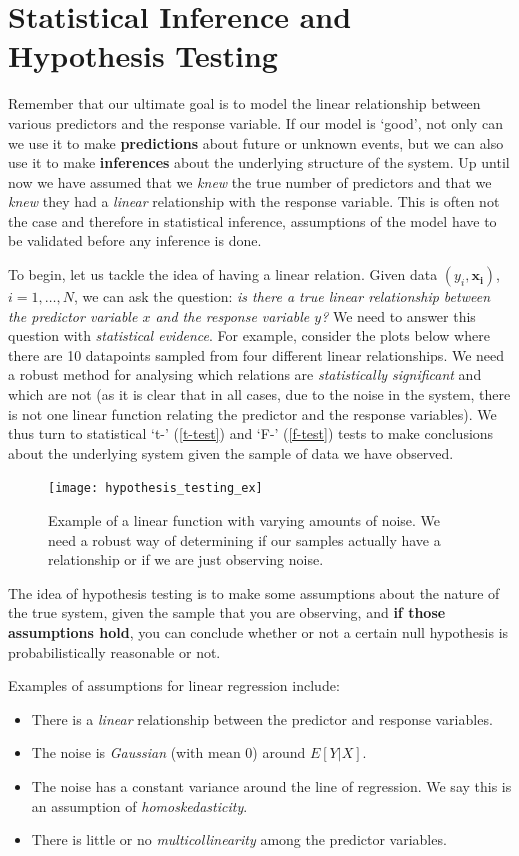 \documentclass{article}
\begin{document}
\section{Statistical Inference and Hypothesis Testing}
Remember that our ultimate goal is to model the linear relationship between various predictors and the response variable. If our model is `good', not only can we use it to make \textbf{predictions} about future or unknown events, but we can also use it to make \textbf{inferences} about the underlying structure of the system. Up until now we have assumed that we \textit{knew} the true number of predictors and that we \textit{knew} they had a \textit{linear} relationship with the response variable. This is often not the case and therefore in statistical inference, assumptions of the model have to be validated before any inference is done.

To begin, let us tackle the idea of having a linear relation. Given data $(y_i, \mathbf{x_i})$, $i=1,\dots,N$, we can ask the question: \textit{is there a true linear relationship between the predictor variable $x$ and the response variable $y$?} We need to answer this question with \textit{statistical evidence}. For example, consider the plots below where there are 10 datapoints sampled from four different linear relationships. We need a robust method for analysing which relations are \textit{statistically significant} and which are not (as it is clear that in all cases, due to the noise in the system, there is not one linear function relating the predictor and the response variables). We thus turn to statistical `t-' (\ref{t-test}) and `F-' (\ref{f-test}) tests to make conclusions about the underlying system given the sample of data we have observed.

\begin{figure}[h]
\center
\texttt{[image: hypothesis\_testing\_ex]}
\caption{Example of a linear function with varying amounts of noise. We need a robust way of determining if our samples actually have a relationship or if we are just observing noise.}\label{im:hypothesis_test}
\end{figure}

The idea of hypothesis testing is to make some assumptions about the nature of the true system, given the sample that you are observing, and \textbf{if those assumptions hold}, you can conclude whether or not a certain null hypothesis is probabilistically reasonable or not.

Examples of assumptions for linear regression include:
\begin{itemize}
\item There is a \textit{linear} relationship between the predictor and response variables.
\item The noise is \textit{Gaussian} (with mean 0) around $E[Y\vert X]$.
\item The noise has a constant variance around the line of regression. We say this is an assumption of \textit{homoskedasticity}.
\item There is little or no \textit{multicollinearity} among the predictor variables.
\end{itemize}
\end{document}
